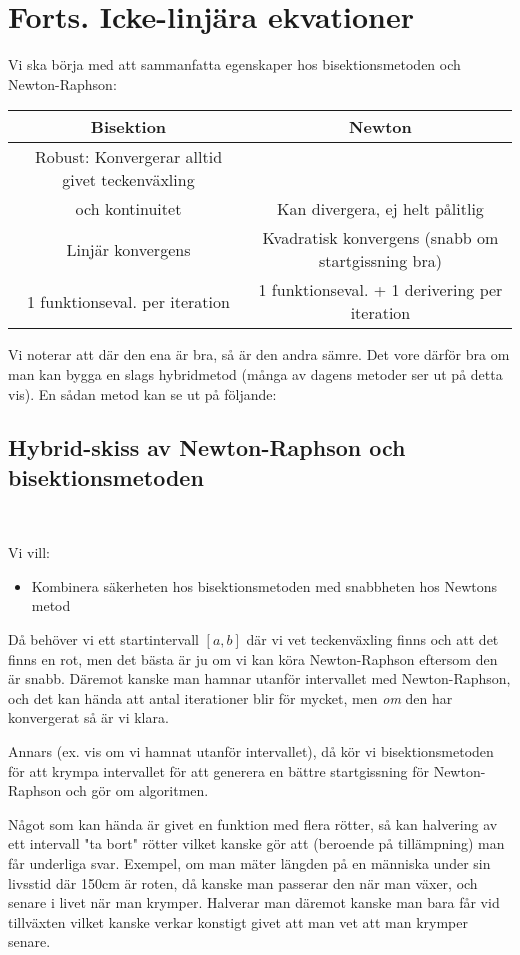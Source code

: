 \section{Forts. Icke-linjära ekvationer}
\par\bigskip
\noindent Vi ska börja med att sammanfatta egenskaper hos bisektionsmetoden och Newton-Raphson:

\begin{center}
  \begin{tabular}{|c|c|}
    \hline
    Bisektion&Newton\\
    \hline
    Robust: Konvergerar alltid givet teckenväxling\\ och kontinuitet&Kan divergera, ej helt pålitlig\\
    \hline
    Linjär konvergens&Kvadratisk konvergens (snabb om startgissning bra)\\
    \hline
    1 funktionseval. per iteration&1 funktionseval. + 1 derivering per iteration\\
    \hline
  \end{tabular}
\end{center}
\par\bigskip
\noindent Vi noterar att där den ena är bra, så är den andra sämre. Det vore därför bra om man kan bygga en slags hybridmetod (många av dagens metoder ser  ut på detta vis). En sådan metod kan se ut på följande:

\subsection{Hybrid-skiss av Newton-Raphson och bisektionsmetoden}\hfill\\
\par\bigskip
\noindent Vi vill:
\begin{itemize}
  \item Kombinera säkerheten hos bisektionsmetoden med snabbheten hos Newtons metod 
\end{itemize}
\par\bigskip
\noindent Då behöver vi ett startintervall $[a,b]$ där vi vet teckenväxling finns och att det finns en rot, men det bästa är ju om vi kan köra Newton-Raphson eftersom den är snabb. Däremot kanske man hamnar utanför intervallet med Newton-Raphson, och det kan hända att antal iterationer blir för mycket, men \textit{om} den har konvergerat så är vi klara.\par\noindent Annars (ex. vis om vi hamnat utanför intervallet), då kör vi bisektionsmetoden för att krympa intervallet för att generera en bättre startgissning för Newton-Raphson och gör om algoritmen.
\par\bigskip
\noindent Något som kan hända är givet en funktion med flera rötter, så kan halvering av ett intervall "ta bort" rötter vilket kanske gör att (beroende på tillämpning) man får underliga svar. Exempel, om man mäter längden på en människa under sin livsstid där 150cm är roten, då kanske man passerar den när man växer, och senare i livet när man krymper. Halverar man däremot kanske man bara får vid tillväxten vilket kanske verkar konstigt givet att man vet att man krymper senare.
\par\bigskip

